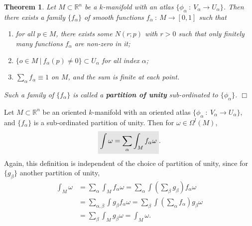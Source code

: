 \documentclass[letter-paper]{tufte-book}
\newtheorem{theorem}{\color{pastel-blue}Theorem}[section]
\newcommand{\qedwhite}{\hfill \ensuremath{\Box}}
\newcommand{\highlight}[1]{\mathchoice%
  {\colorbox{black!10}{$\displaystyle#1$}}%
  {\colorbox{black!10}{$\textstyle#1$}}%
  {\colorbox{black!10}{$\scriptstyle#1$}}%
  {\colorbox{black!10}{$\scriptscriptstyle#1$}}}%
\begin{document}
\begin{theorem}
  Let $M \subset \mathbb{R}^n$ be a $k$-manifold with an atlas $\{\phi_\alpha\ :\ V_\alpha \to U_\alpha\}$. Then there exists a family $\{f_\alpha\}$ of smooth functions $f_\alpha\ :\ M \to [0, 1]$ such that
  \begin{enumerate}
    \item for all $p \in M$, there exists some $N(r; p)$ with $r>0$ such that only finitely many functions $f_\alpha$ are non-zero in it;
    \item $\{o \in M\ |\ f_\alpha(p) \neq 0\} \subset U_\alpha$ for all index $\alpha$;
    \item $\sum_\alpha f_\alpha \equiv 1$ on $M$, and the sum is finite at each point.
  \end{enumerate}
  Such a family of $\{f_\alpha\}$ is called a \textbf{partition of unity} sub-ordinated to $\{\phi_\alpha\}$. \qedwhite
\end{theorem}

Let $M \subset \mathbb{R}^n$ be an oriented $k$-manifold with an oriented atlas $\{\phi_\alpha\ :\ V_\alpha \to U_\alpha\}$, and $\{f_\alpha\}$ is a sub-ordinated partition of unity. Then for $\omega \in \Omega^l(M)$,
\begin{equation}\label{eq:part_unity}
  \highlight{\int\omega = \sum_\alpha \int_M f_\alpha \omega}.
\end{equation}
Again, this definition is independent of the choice of partition of unity, since for $\{g_\beta\}$ another partition of unity,
\begin{align*}
  \int_M \omega
    &= \sum_\alpha \int_M f_\alpha \omega = \sum_\alpha \int (\sum_\beta g_\beta) f_\alpha \omega\\
    &= \sum_{\alpha, \beta} \int g_\beta f_\alpha \omega = \sum_\beta \int (\sum_\alpha f_\alpha) g_\beta \omega\\
    &= \sum_\beta \int_M g_\beta \omega = \int_M \omega.
\end{align*}
\end{document}
